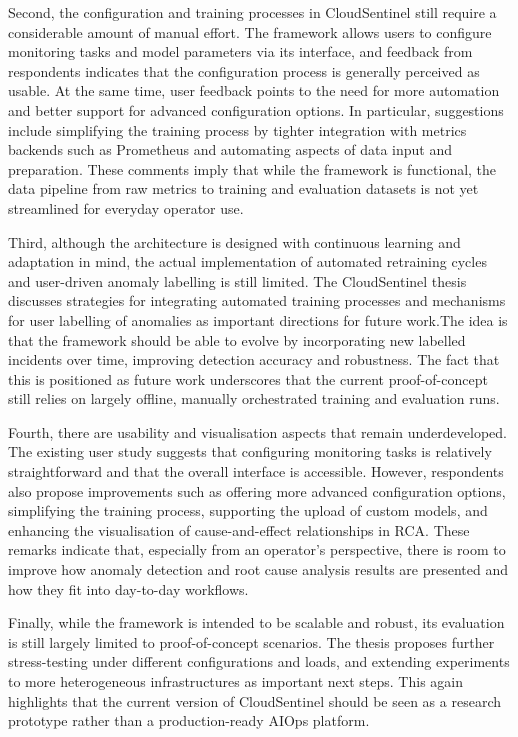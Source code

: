 Second, the configuration and training processes in CloudSentinel still require a considerable amount of manual effort. The framework allows users to configure monitoring tasks and model parameters via its interface, and feedback from respondents indicates that the configuration process is generally perceived as usable. At the same time, user feedback points to the need for more automation and better support for advanced configuration options. In particular, suggestions include simplifying the training process by tighter integration with metrics backends such as Prometheus and automating aspects of data input and preparation. These comments imply that while the framework is functional, the data pipeline from raw metrics to training and evaluation datasets is not yet streamlined for everyday operator use.

Third, although the architecture is designed with continuous learning and adaptation in mind, the actual implementation of automated retraining cycles and user-driven anomaly labelling is still limited. The CloudSentinel thesis discusses strategies for integrating automated training processes and mechanisms for user labelling of anomalies as important directions for future work.The idea is that the framework should be able to evolve by incorporating new labelled incidents over time, improving detection accuracy and robustness. The fact that this is positioned as future work underscores that the current proof-of-concept still relies on largely offline, manually orchestrated training and evaluation runs.

Fourth, there are usability and visualisation aspects that remain underdeveloped. The existing user study suggests that configuring monitoring tasks is relatively straightforward and that the overall interface is accessible. However, respondents also propose improvements such as offering more advanced configuration options, simplifying the training process, supporting the upload of custom models, and enhancing the visualisation of cause-and-effect relationships in RCA. These remarks indicate that, especially from an operator’s perspective, there is room to improve how anomaly detection and root cause analysis results are presented and how they fit into day-to-day workflows.

Finally, while the framework is intended to be scalable and robust, its evaluation is still largely limited to proof-of-concept scenarios. The thesis proposes further stress-testing under different configurations and loads, and extending experiments to more heterogeneous infrastructures as important next steps. This again highlights that the current version of CloudSentinel should be seen as a research prototype rather than a production-ready AIOps platform.

